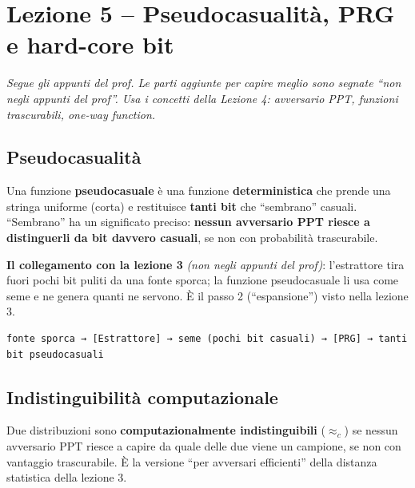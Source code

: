 
\chapter{Lezione 5 -- Pseudocasualità, PRG e hard-core bit}

\emph{Segue gli appunti del prof. Le parti aggiunte per capire meglio sono segnate ``non negli appunti del prof''. Usa i concetti della Lezione 4: avversario PPT, funzioni trascurabili, one-way function.}

\section{Pseudocasualità}

\begin{inbreve}

Una funzione \textbf{pseudocasuale} è una funzione \textbf{deterministica} che prende una stringa uniforme (corta) e restituisce \textbf{tanti bit} che ``sembrano'' casuali. ``Sembrano'' ha un significato preciso: \textbf{nessun avversario PPT riesce a distinguerli da bit davvero casuali}, se non con probabilità trascurabile.

\end{inbreve}

\textbf{Il collegamento con la lezione 3} \emph{(non negli appunti del prof)}: l'estrattore tira fuori pochi bit puliti da una fonte sporca; la funzione pseudocasuale li usa come seme e ne genera quanti ne servono. È il passo 2 (``espansione'') visto nella lezione 3.

\begin{verbatim}
fonte sporca → [Estrattore] → seme (pochi bit casuali) → [PRG] → tanti bit pseudocasuali
\end{verbatim}

\section{Indistinguibilità computazionale}

\begin{inbreve}

Due distribuzioni sono \textbf{computazionalmente indistinguibili} (\(\approx_c\)) se nessun avversario PPT riesce a capire da quale delle due viene un campione, se non con vantaggio trascurabile. È la versione ``per avversari efficienti'' della distanza statistica della lezione 3.

\end{inbreve}

